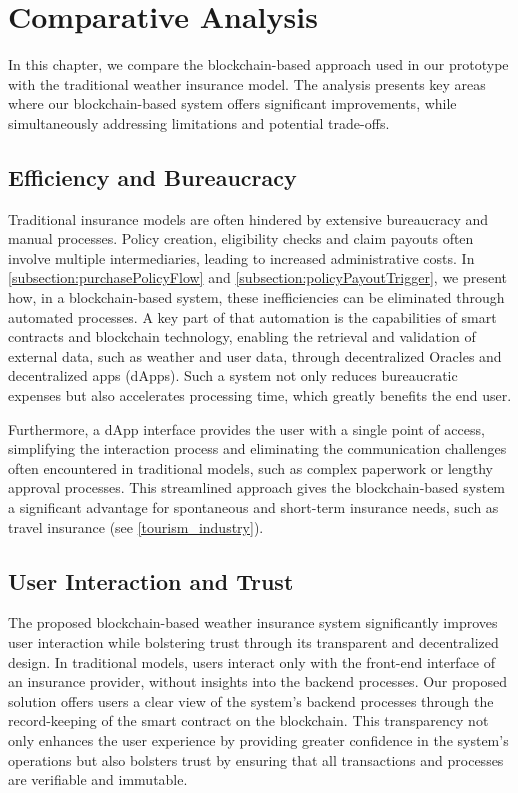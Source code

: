 \section{Comparative Analysis}\label{comparitive_analysis}
In this chapter, we compare the blockchain-based approach used in our prototype with the traditional weather insurance model. The analysis presents key areas where our blockchain-based system offers significant improvements, while simultaneously addressing limitations and potential trade-offs.

\subsection{Efficiency and Bureaucracy}\label{efficiency_bureaucracy}
Traditional insurance models are often hindered by extensive bureaucracy and manual processes. Policy creation, eligibility checks and claim payouts often involve multiple intermediaries, leading to increased administrative costs. In \cref{subsection:purchasePolicyFlow} and \cref{subsection:policyPayoutTrigger}, we present how, in a blockchain-based system, these inefficiencies can be eliminated through automated processes. A key part of that automation is the capabilities of smart contracts and blockchain technology, enabling the retrieval and validation of external data, such as weather and user data, through decentralized Oracles and decentralized apps (dApps). Such a system not only reduces bureaucratic expenses but also accelerates processing time, which greatly benefits the end user.

Furthermore, a dApp interface provides the user with a single point of access, simplifying the interaction process and eliminating the communication challenges often encountered in traditional models, such as complex paperwork or lengthy approval processes. This streamlined approach gives the blockchain-based system a significant advantage for spontaneous and short-term insurance needs, such as travel insurance (see \cref{tourism_industry}).

\subsection{User Interaction and Trust}\label{user_interaction_and_trust}
The proposed blockchain-based weather insurance system significantly improves user interaction while bolstering trust through its transparent and decentralized design. In traditional models, users interact only with the front-end interface of an insurance provider, without insights into the backend processes. Our proposed solution offers users a clear view of the system's backend processes through the record-keeping of the smart contract on the blockchain. This transparency not only enhances the user experience by providing greater confidence in the system's operations but also bolsters trust by ensuring that all transactions and processes are verifiable and immutable.

